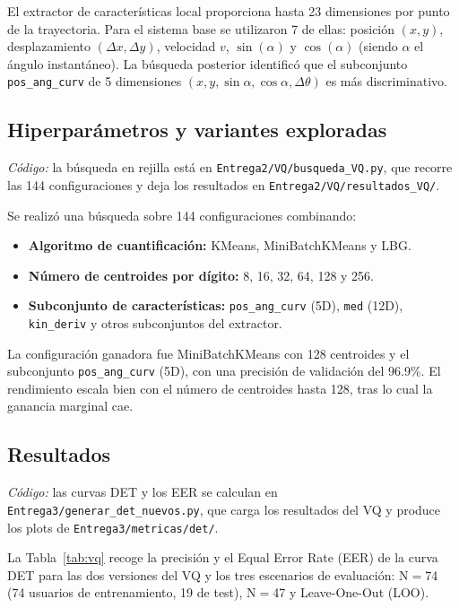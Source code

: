 \documentclass[11pt,a4paper]{article}
\begin{document}
El extractor de caracter\'{i}sticas local proporciona hasta 23 dimensiones por punto
de la trayectoria. Para el sistema base se utilizaron 7 de ellas:
posici\'{o}n $(x, y)$, desplazamiento $(\Delta x, \Delta y)$, velocidad $v$,
$\sin(\alpha)$ y $\cos(\alpha)$ (siendo $\alpha$ el \'{a}ngulo instant\'{a}neo).
La b\'{u}squeda posterior identific\'{o} que el subconjunto \texttt{pos\_ang\_curv}
de 5 dimensiones $(x, y, \sin\alpha, \cos\alpha, \Delta\theta)$ es m\'{a}s discriminativo.

\subsection{Hiperpar\'{a}metros y variantes exploradas}

\textit{C\'{o}digo:} la b\'{u}squeda en rejilla est\'{a} en
\texttt{Entrega2/VQ/busqueda\_VQ.py}, que recorre las 144 configuraciones
y deja los resultados en \texttt{Entrega2/VQ/resultados\_VQ/}.

Se realiz\'{o} una b\'{u}squeda sobre 144 configuraciones combinando:

\begin{itemize}
  \item \textbf{Algoritmo de cuantificaci\'{o}n:} KMeans, MiniBatchKMeans y LBG.
  \item \textbf{N\'{u}mero de centroides por d\'{i}gito:} 8, 16, 32, 64, 128 y 256.
  \item \textbf{Subconjunto de caracter\'{i}sticas:} \texttt{pos\_ang\_curv} (5D),
        \texttt{med} (12D), \texttt{kin\_deriv} y otros subconjuntos del extractor.
\end{itemize}

\noindent La configuraci\'{o}n ganadora fue MiniBatchKMeans con 128 centroides y el
subconjunto \texttt{pos\_ang\_curv} (5D), con una precisi\'{o}n de validaci\'{o}n del
96.9\%. El rendimiento escala bien con el n\'{u}mero de centroides hasta 128, tras
lo cual la ganancia marginal cae.

\subsection{Resultados}

\textit{C\'{o}digo:} las curvas DET y los EER se calculan en
\texttt{Entrega3/generar\_det\_nuevos.py}, que carga los resultados del
VQ y produce los plots de \texttt{Entrega3/metricas/det/}.

La Tabla~\ref{tab:vq} recoge la precisi\'{o}n y el Equal Error Rate (EER) de la
curva DET para las dos versiones del VQ y los tres escenarios de evaluaci\'{o}n:
N$=$74 (74 usuarios de entrenamiento, 19 de test), N$=$47 y Leave-One-Out (LOO).
\end{document}

